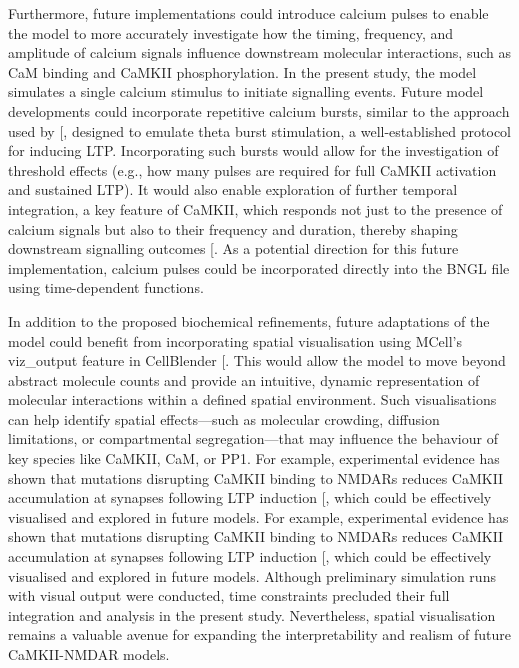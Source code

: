 \documentclass[
  11pt,
  letterpaper,
]{scrreprt}
\begin{document}
Furthermore, future implementations could introduce calcium pulses to
enable the model to more accurately investigate how the timing,
frequency, and amplitude of calcium signals influence downstream
molecular interactions, such as CaM binding and CaMKII phosphorylation.
In the present study, the model simulates a single calcium stimulus to
initiate signalling events. Future model developments could incorporate
repetitive calcium bursts, similar to the approach used by
{[}\citeproc{ref-chang2019Mechanismsa}{476}{]}, designed to emulate
theta burst stimulation, a well-established protocol for inducing LTP.
Incorporating such bursts would allow for the investigation of threshold
effects (e.g., how many pulses are required for full CaMKII activation
and sustained LTP). It would also enable exploration of further temporal
integration, a key feature of CaMKII, which responds not just to the
presence of calcium signals but also to their frequency and duration,
thereby shaping downstream signalling outcomes
{[}\citeproc{ref-chang2017CaMKII}{153}{]}. As a potential direction for
this future implementation, calcium pulses could be incorporated
directly into the BNGL file using time-dependent functions.

In addition to the proposed biochemical refinements, future adaptations
of the model could benefit from incorporating spatial visualisation
using MCell's viz\_output feature in CellBlender
{[}\citeproc{ref-gupta2018Spatial}{297}{]}. This would allow the model
to move beyond abstract molecule counts and provide an intuitive,
dynamic representation of molecular interactions within a defined
spatial environment. Such visualisations can help identify spatial
effects---such as molecular crowding, diffusion limitations, or
compartmental segregation---that may influence the behaviour of key
species like CaMKII, CaM, or PP1. For example, experimental evidence has
shown that mutations disrupting CaMKII binding to NMDARs reduces CaMKII
accumulation at synapses following LTP induction
{[}\citeproc{ref-bayer2001Interactiona}{127}{]}, which could be
effectively visualised and explored in future models. For example,
experimental evidence has shown that mutations disrupting CaMKII binding
to NMDARs reduces CaMKII accumulation at synapses following LTP
induction {[}\citeproc{ref-bayer2001Interactiona}{127}{]}, which could
be effectively visualised and explored in future models. Although
preliminary simulation runs with visual output were conducted, time
constraints precluded their full integration and analysis in the present
study. Nevertheless, spatial visualisation remains a valuable avenue for
expanding the interpretability and realism of future CaMKII-NMDAR
models.
\end{document}
